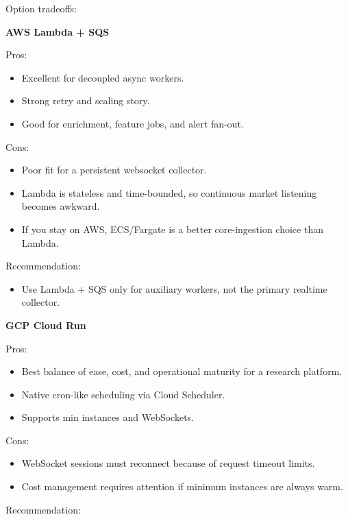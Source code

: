 \documentclass[
]{article}
\providecommand{\tightlist}{%
  \setlength{\itemsep}{0pt}\setlength{\parskip}{0pt}}
\begin{document}
Option tradeoffs:

\textbf{AWS Lambda + SQS}

Pros:

\begin{itemize}
\tightlist
\item
  Excellent for decoupled async workers.
\item
  Strong retry and scaling story.
\item
  Good for enrichment, feature jobs, and alert fan-out.
\end{itemize}

Cons:

\begin{itemize}
\tightlist
\item
  Poor fit for a persistent websocket collector.
\item
  Lambda is stateless and time-bounded, so continuous market listening
  becomes awkward.
\item
  If you stay on AWS, ECS/Fargate is a better core-ingestion choice than
  Lambda.
\end{itemize}

Recommendation:

\begin{itemize}
\tightlist
\item
  Use Lambda + SQS only for auxiliary workers, not the primary realtime
  collector.
\end{itemize}

\textbf{GCP Cloud Run}

Pros:

\begin{itemize}
\tightlist
\item
  Best balance of ease, cost, and operational maturity for a research
  platform.
\item
  Native cron-like scheduling via Cloud Scheduler.
\item
  Supports min instances and WebSockets.
\end{itemize}

Cons:

\begin{itemize}
\tightlist
\item
  WebSocket sessions must reconnect because of request timeout limits.
\item
  Cost management requires attention if minimum instances are always
  warm.
\end{itemize}

Recommendation:
\end{document}
